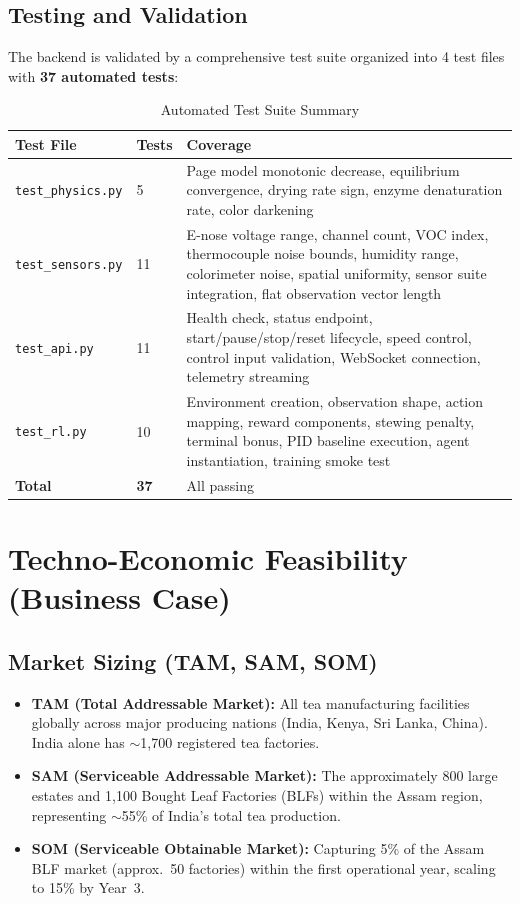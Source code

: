 ﻿\documentclass[12pt, a4paper]{report}
\begin{document}
\section{Testing and Validation}
The backend is validated by a comprehensive test suite organized into 4 test files with \textbf{37 automated tests}:

\begin{table}[H]
\centering
\caption{Automated Test Suite Summary}
\label{tab:tests}
\begin{tabular}{@{}llp{8cm}@{}}
\toprule
\textbf{Test File} & \textbf{Tests} & \textbf{Coverage} \\
\midrule
\texttt{test\_physics.py} & 5 & Page model monotonic decrease, equilibrium convergence, drying rate sign, enzyme denaturation rate, color darkening \\
\texttt{test\_sensors.py}  & 11 & E-nose voltage range, channel count, VOC index, thermocouple noise bounds, humidity range, colorimeter noise, spatial uniformity, sensor suite integration, flat observation vector length \\
\texttt{test\_api.py}      & 11 & Health check, status endpoint, start/pause/stop/reset lifecycle, speed control, control input validation, WebSocket connection, telemetry streaming \\
\texttt{test\_rl.py}       & 10 & Environment creation, observation shape, action mapping, reward components, stewing penalty, terminal bonus, PID baseline execution, agent instantiation, training smoke test \\
\midrule
\textbf{Total} & \textbf{37} & All passing \\
\bottomrule
\end{tabular}
\end{table}


\chapter{Techno-Economic Feasibility (Business Case)}

\section{Market Sizing (TAM, SAM, SOM)}
\begin{itemize}
    \item \textbf{TAM (Total Addressable Market):} All tea manufacturing facilities globally across major producing nations (India, Kenya, Sri Lanka, China). India alone has $\sim$1,700 registered tea factories.
    \item \textbf{SAM (Serviceable Addressable Market):} The approximately 800 large estates and 1,100 Bought Leaf Factories (BLFs) within the Assam region, representing $\sim$55\% of India's total tea production.
    \item \textbf{SOM (Serviceable Obtainable Market):} Capturing 5\% of the Assam BLF market (approx.\ 50 factories) within the first operational year, scaling to 15\% by Year~3.
\end{itemize}
\end{document}

